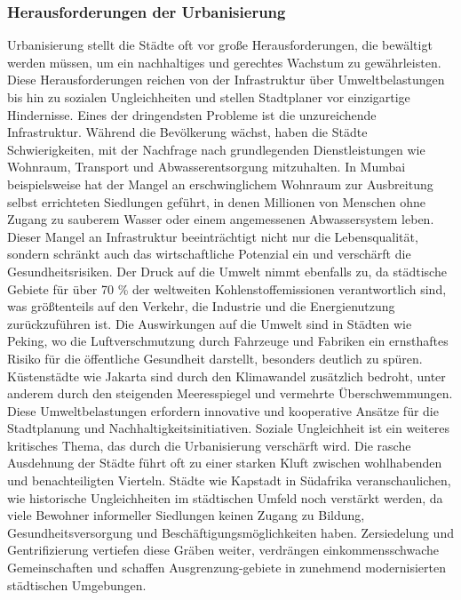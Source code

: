 \documentclass[conference,compsoc,final,a4paper, onecolumn, 11pt]{IEEEtran}
\begin{document}
\subsubsection{Herausforderungen der Urbanisierung}
Urbanisierung stellt die Städte oft vor große Herausforderungen, die bewältigt werden müssen, um ein nachhaltiges und gerechtes Wachstum zu gewährleisten. 
Diese Herausforderungen reichen von der Infrastruktur über Umweltbelastungen bis hin zu sozialen Ungleichheiten und stellen Stadtplaner vor einzigartige Hindernisse.
Eines der dringendsten Probleme ist die unzureichende Infrastruktur. 
Während die Bevölkerung wächst, haben die Städte Schwierigkeiten, mit der Nachfrage nach grundlegenden Dienstleistungen wie Wohnraum, Transport und Abwasserentsorgung mitzuhalten. \autocite[S. 13ff]{zhang_trends_2015}
In Mumbai beispielsweise hat der Mangel an erschwinglichem Wohnraum zur Ausbreitung selbst errichteten Siedlungen geführt, in denen Millionen von Menschen ohne Zugang zu sauberem Wasser oder einem angemessenen Abwassersystem leben. \autocite{bhattarai_exposing_2020}
Dieser Mangel an Infrastruktur beeinträchtigt nicht nur die Lebensqualität, sondern schränkt auch das wirtschaftliche Potenzial ein und verschärft die Gesundheitsrisiken.
Der Druck auf die Umwelt nimmt ebenfalls zu, da städtische Gebiete für über 70 \% der weltweiten Kohlenstoffemissionen verantwortlich sind, was größtenteils auf den Verkehr, die Industrie und die Energienutzung zurückzuführen ist. \autocite[S. 192f]{taubenbock_globale_2015}
Die Auswirkungen auf die Umwelt sind in Städten wie Peking, wo die Luftverschmutzung durch Fahrzeuge und Fabriken ein ernsthaftes Risiko für die öffentliche Gesundheit darstellt, besonders deutlich zu spüren. \autocite{hao_improving_2005}
Küstenstädte wie Jakarta sind durch den Klimawandel zusätzlich bedroht, unter anderem durch den steigenden Meeresspiegel und vermehrte Überschwemmungen. 
Diese Umweltbelastungen erfordern innovative und kooperative Ansätze für die Stadtplanung und Nachhaltigkeitsinitiativen. \autocite{owen-burge_jakarta_2022}
Soziale Ungleichheit ist ein weiteres kritisches Thema, das durch die Urbanisierung verschärft wird. 
Die rasche Ausdehnung der Städte führt oft zu einer starken Kluft zwischen wohlhabenden und benachteiligten Vierteln. 
Städte wie Kapstadt in Südafrika veranschaulichen, wie historische Ungleichheiten im städtischen Umfeld noch verstärkt werden, da viele Bewohner informeller Siedlungen keinen Zugang zu Bildung, Gesundheitsversorgung und Beschäftigungsmöglichkeiten haben. 
Zersiedelung und Gentrifizierung vertiefen diese Gräben weiter, verdrängen einkommensschwache Gemeinschaften und schaffen Ausgrenzung-gebiete in zunehmend modernisierten städtischen Umgebungen. \autocite{turok_social_2021}
\end{document}
